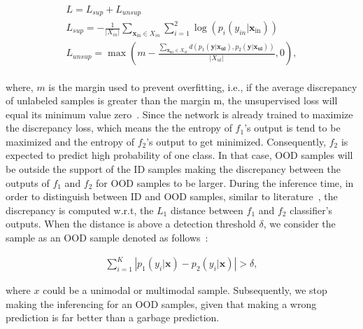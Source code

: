 \vspace{-4mm}
\begin{align}
    \begin{array}{c}
        {L}={L}_{sup}+{L}_{unsup} \\ 
        {L}_{sup}=-\frac{1}{\left|X_{i n}\right|} \sum_{\mathbf{x}_{\mathrm{in}} \in X_{in}} \sum_{i=1}^{2} \log \left(p_{i}\left(y_{i n} | \mathbf{x}_{\mathrm{in}}\right)\right) \\ 
        {L}_{unsup}=\max \left(m-\frac{\sum_{\mathbf{x}_{\mathbf{u} 1} \in X_{ul}} d\left(p_{1}\left(\mathbf{y} | \mathbf{x}_{\mathbf{ul}}\right), p_{2}\left(\mathbf{y} | \mathbf{x}_{\mathbf{ul}}\right)\right)} {\left|X_{ul}\right|},0\right),
    \end{array}
    \label{eq:ood_join_loss}
\end{align}

\hspace*{3.5mm} where, $m$ is the margin used to prevent overfitting, i.e., if the average discrepancy of unlabeled samples is greater than the margin m, the unsupervised loss will equal its minimum value zero~\cite{yu2019unsupervised}. Since the network is already trained to maximize the discrepancy loss, which means the the entropy of $f_1$’s output is tend to be maximized and the entropy of $f_2$’s output to get minimized. Consequently, $f_2$ is expected to predict high probability of one class. In that case, OOD samples will be outside the support of the ID samples making the discrepancy between the outputs of $f_{1}$ and $f_{2}$ for OOD samples to be larger. During the inference time, in order to distinguish between ID and OOD samples, similar to literature~\cite{yu2019unsupervised}, the discrepancy is computed w.r.t, the $L_1$ distance between $f_{1}$ and $f_{2}$ classifier's outputs. When the distance is above a detection threshold $\delta$, we consider the sample as an OOD sample denoted as follows~\cite{yu2019unsupervised}: 

\vspace{-6mm}
\begin{align}
    \sum_{i=1}^{K}\left|p_{1}\left(y_{i} | \mathbf{x}\right)-p_{2}\left(y_{i} | \mathbf{x}\right)\right|>\delta, 
\end{align}

\hspace*{3.5mm} where $x$ could be a unimodal or multimodal sample. Subsequently, we stop making the inferencing for an OOD samples, given that making a wrong prediction is far better than a garbage prediction. 

